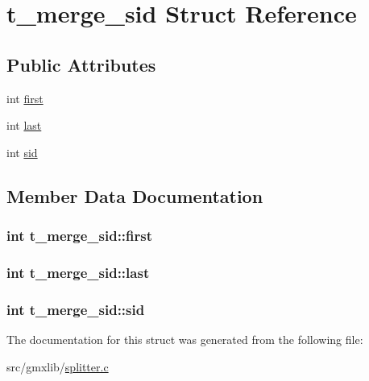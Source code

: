 \hypertarget{structt__merge__sid}{\section{t\-\_\-merge\-\_\-sid \-Struct \-Reference}
\label{structt__merge__sid}
}
\subsection*{\-Public \-Attributes}
\begin{DoxyCompactItemize}
\item 
int \hyperlink{structt__merge__sid_a3b8c79e919392d0798e9f8f26d6627de}{first}
\item 
int \hyperlink{structt__merge__sid_a57320d0b383f59ed4364531b63b89c31}{last}
\item 
int \hyperlink{structt__merge__sid_a722fb16242a283e3213f2af4afe4582b}{sid}
\end{DoxyCompactItemize}


\subsection{\-Member \-Data \-Documentation}
\hypertarget{structt__merge__sid_a3b8c79e919392d0798e9f8f26d6627de}{
\subsubsection[{first}]{\setlength{\rightskip}{0pt plus 5cm}int {\bf t\-\_\-merge\-\_\-sid\-::first}}}\label{structt__merge__sid_a3b8c79e919392d0798e9f8f26d6627de}
\hypertarget{structt__merge__sid_a57320d0b383f59ed4364531b63b89c31}{
\subsubsection[{last}]{\setlength{\rightskip}{0pt plus 5cm}int {\bf t\-\_\-merge\-\_\-sid\-::last}}}\label{structt__merge__sid_a57320d0b383f59ed4364531b63b89c31}
\hypertarget{structt__merge__sid_a722fb16242a283e3213f2af4afe4582b}{
\subsubsection[{sid}]{\setlength{\rightskip}{0pt plus 5cm}int {\bf t\-\_\-merge\-\_\-sid\-::sid}}}\label{structt__merge__sid_a722fb16242a283e3213f2af4afe4582b}


\-The documentation for this struct was generated from the following file\-:\begin{DoxyCompactItemize}
\item 
src/gmxlib/\hyperlink{splitter_8c}{splitter.\-c}\end{DoxyCompactItemize}
